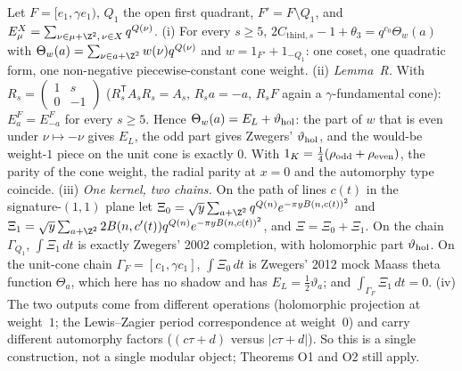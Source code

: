 \begin{theorem}\label{thm:cthird}
Let $F=[e_1,\gamma e_1)$, $Q_1$ the open first quadrant, $F'=F\setminus Q_1$, and $E^X_\mu=\sum_{\nu\in\mu+\Z^2,\,\nu\in X}q^{Q(\nu)}$.
(i) For every $s\ge5$, $2C_{\mathrm{third},s}-1+\theta_3=q^{c_0}\Theta_w(a)$ with $\Theta_w(a)=\sum_{\nu\in a+\Z^2}w(\nu)q^{Q(\nu)}$ and
$w=1_{F'}+1_{-Q_1}$: one coset, one quadratic form, one non-negative piecewise-constant cone weight.
(ii) \emph{Lemma~R.} With $R_s=\begin{pmatrix}1&s\\0&-1\end{pmatrix}$ ($R_s^{\mathsf T}A_sR_s=A_s$, $R_sa=-a$, $R_sF$ again a $\gamma$-fundamental cone):
$E^F_a=E^F_{-a}$ for every $s\ge5$. Hence $\Theta_w(a)=E_L+\vartheta_{\rm hol}$: the part of $w$ that is even under $\nu\mapsto-\nu$ gives $E_L$, the odd part gives
Zwegers' $\vartheta_{\rm hol}$, and the would-be weight-$1$ piece on the unit cone is exactly $0$. With $1_K=\tfrac14(\rho_{\rm odd}+\rho_{\rm even})$, the
parity of the cone weight, the radial parity at $x=0$ and the automorphy type coincide.
(iii) \emph{One kernel, two chains.} On the path of lines $c(t)$ in the signature-$(1,1)$ plane let
$\Xi_0=\sqrt y\sum_{a+\Z^2}q^{Q(n)}e^{-\pi yB(n,c(t))^2}$ and $\Xi_1=\sqrt y\sum_{a+\Z^2}2B(n,c'(t))q^{Q(n)}e^{-\pi yB(n,c(t))^2}$, and $\Xi=\Xi_0+\Xi_1$. On the chain
$\Gamma_{Q_1}$, $\int\Xi_1\,dt$ is exactly Zwegers' 2002 completion, with holomorphic part $\vartheta_{\rm hol}$. On the unit-cone chain $\Gamma_F=[c_1,\gamma c_1]$,
$\int\Xi_0\,dt$ is Zwegers' 2012 mock Maass theta function $\Theta_a$, which here has no shadow and has $E_L=\tfrac12\vartheta_a$; and $\int_{\Gamma_F}\Xi_1\,dt=0$.
(iv) The two outputs come from different operations (holomorphic projection at weight~$1$; the Lewis--Zagier period correspondence at weight~$0$) and carry
different automorphy factors ($(c\tau+d)$ versus $|c\tau+d|$). So this is a single construction, not a single modular object; Theorems O1 and O2 still apply.
\end{theorem}
